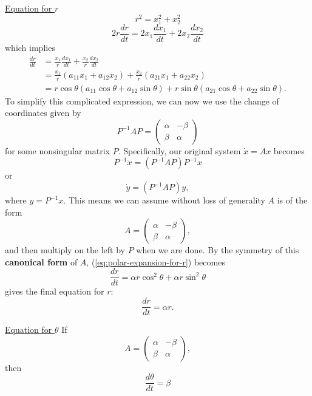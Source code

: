 \documentclass[11pt, letterpaper, oneside]{article}     %
\numberwithin{equation}{subsection}
\theoremstyle{definition}
\numberwithin{theorem}{section}
\theoremstyle{remark}
\begin{document}
\underline{Equation for $r$}
\begin{equation}
  r^2 = x_1^2 + x_2^2
\end{equation}
\begin{equation}
  2r\frac{dr}{dt} = 2x_1\frac{dx_1}{dt} + 2x_2\frac{dx_2}{dt}
\end{equation}
which implies
\begin{align}
  \frac{dr}{dt} &= \frac{x_1}{r}\frac{dx_1}{dt} + \frac{x_2}{r}\frac{dx_2}{dt}\\
  &= \frac{x_1}{r}(a_{11}x_1 + a_{12}x_2) + \frac{x_2}{r}(a_{21}x_1 + a_{22}x_2)\\\label{eq:polar-expansion-for-r}
  &= r\cos\theta(a_{11}\cos\theta + a_{12}\sin\theta) + r\sin\theta(a_{21}\cos\theta + a_{22}\sin\theta).
\end{align}
To simplify this complicated expression, we can now we use the change of coordinates given by
\begin{equation}
  P^{-1}AP =
  \begin{pmatrix}
    \alpha & -\beta\\
    \beta & \alpha
  \end{pmatrix}
\end{equation}
for some nonsingular matrix $P$. Specifically, our original system $\dot x = Ax$ becomes
\begin{equation}
  P^{-1}\dot x = (P^{-1}AP)P^{-1}x
\end{equation}
or
\begin{equation}
  \dot y = (P^{-1}AP)y,
\end{equation}
where $y = P^{-1}x$.
This means we can assume without loss of generality $A$ is of the form
\begin{equation}
  A =
  \begin{pmatrix}
    \alpha & -\beta\\
    \beta & \alpha
  \end{pmatrix},
\end{equation}
and then multiply on the left by $P$ when we are done. By the symmetry of this \textbf{canonical form} of $A$, (\ref{eq:polar-expansion-for-r}) becomes
\begin{equation}
  \frac{dr}{dt} = \alpha r\cos^2\theta + \alpha r\sin^2\theta
\end{equation}
gives the final equation for $r$:
\begin{equation}
  \frac{dr}{dt} = \alpha r.
\end{equation}

\underline{Equation for $\theta$}
If
\begin{equation}
  A =
  \begin{pmatrix}
    \alpha & -\beta\\
    \beta & \alpha
  \end{pmatrix},
\end{equation}
then
\begin{equation}
  \frac{d\theta}{dt} = \beta
\end{equation}
\end{document}
